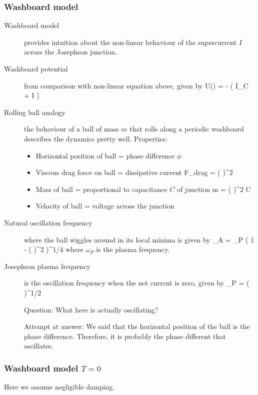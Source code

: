 \subsubsection{Washboard model}
\begin{description}
\item[Washboard model] provides intuition about the non-linear behaviour of the supercurrent $I$ across the Josephson junction. 

\item[Washboard potential] from comparison with non-linear equation above, given by 
\beq
U(\phi) = -  \left( I_C \cos{\phi} + I \phi \right)
\eeq


\item[Rolling ball analogy] the behaviour of a ball of mass $m$ that rolls along a periodic washboard describes the dynamics pretty well. Properties:
\begin{itemize}
\item Horizontal position of ball = phase difference $\phi$
\item Viscous drag force on ball = dissipative current
\beq
F_{drag} =  \left(  \right)^2 
\eeq
\item Mass of ball = proportional to capacitance $C$ of junction
\beq
m = \left(  \right)^2 C
\eeq
\item Velocity of ball = voltage across the junction
\end{itemize}

\item[Natural oscillation frequency] where the ball wiggles around in its local minima is given by 
\beq
\omega_A = \omega_P \left( 1 - \left(  \right)^2 \right)^{1/4}
\eeq
where $\omega_P$ is the plasma frequency. 

\item[Josephson plasma frequency] is the oscillation frequency when the net current is zero, given by 
\beq
\omega_P = \left(  \right)^{1/2}
\eeq

Question: What here is actually oscillating? 

Attempt at answer: We said that the horizontal position of the ball is the phase difference. Therefore, it is probably the phase different that oscillates. 
\end{description}
\subsubsection{Washboard model $T= 0$}
Here we assume negligible damping. 

